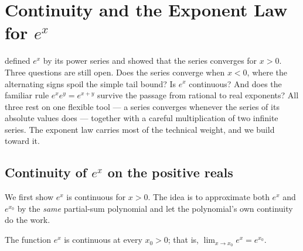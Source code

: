 
\section{Continuity and the Exponent Law for \texorpdfstring{$e^{x}$}{e\^{}x}}\label{sec:continuity-and-exponent-law}

 defined \(e^{x}\) by its power series and showed that the series converges for \(x > 0\). Three questions are still open. Does the series converge when \(x < 0\), where the alternating signs spoil the simple tail bound? Is \(e^{x}\) continuous? And does the familiar rule \(e^{x} e^{y} = e^{x + y}\) survive the passage from rational to real exponents? All three rest on one flexible tool --- a series converges whenever the series of its absolute values does --- together with a careful multiplication of two infinite series. The exponent law carries most of the technical weight, and we build toward it.

\subsection{Continuity of \(e^{x}\) on the positive reals}

We first show \(e^{x}\) is continuous for \(x > 0\). The idea is to approximate both \(e^{x}\) and \(e^{x_{0}}\) by the \emph{same} partial-sum polynomial and let the polynomial's own continuity do the work.

\begin{theorem}\label{thm:exp-continuous-positive}
The function \(e^{x}\) is continuous at every \(x_{0} > 0\); that is, \(\lim_{x \to x_{0}} e^{x} = e^{x_{0}}\).
\end{theorem}

